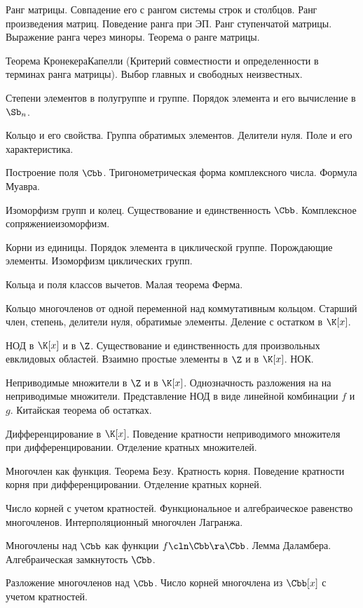 \documentclass[a4paper]{article}
\begin{document}
\begin{nums}{0}
\item Ранг матрицы. Совпадение его с рангом системы строк и столбцов. Ранг произведения матриц. Поведение ранга
при ЭП. Ранг ступенчатой матрицы.
Выражение ранга через миноры. Теорема о ранге матрицы.
\item Теорема Кронекера\ч Капелли (Критерий совместности и определенности в терминах ранга матрицы). Выбор
главных и свободных неизвестных.
\item Степени элементов в полугруппе и группе. Порядок элемента и его вычисление в $\Sb_n$.
\item Кольцо и его свойства. Группа обратимых элементов. Делители нуля. Поле и его характеристика.
\item Построение поля $\Cbb$. Тригонометрическая форма комплексного числа. Формула Муавра.
\item Изоморфизм групп и колец. Существование и единственность $\Cbb$. Комплексное сопряжение\т изоморфизм.
\item Корни из единицы. Порядок элемента в циклической группе. Порождающие элементы. Изоморфизм циклических групп.
\item Кольца и поля классов вычетов. Малая теорема Ферма.
\item Кольцо многочленов от одной переменной над коммутативным кольцом. Старший член, степень, делители нуля,
обратимые элементы. Деление с остатком в $\K[x]$.
\item НОД в $\K[x]$ и в $\Z$. Существование и единственность для произвольных евклидовых областей. Взаимно
простые элементы в $\Z$ и в $\K[x]$. НОК.
\item Неприводимые множители в $\Z$ и в $\K[x]$. Однозначность разложения на на неприводимые множители.
Представление НОД в виде линейной комбинации $f$ и $g$. Китайская теорема об остатках.
\item Дифференцирование в $\K[x]$. Поведение кратности неприводимого множителя при дифференцировании.
Отделение кратных множителей.
\item Многочлен как функция. Теорема Безу. Кратность корня. Поведение кратности корня при дифференцировании.
Отделение кратных корней.
\item Число корней с учетом кратностей. Функциональное и алгебраическое равенство многочленов.
Интерполяционный многочлен Лагранжа.
\item Многочлены над $\Cbb$ как функции $f\cln \Cbb \ra \Cbb$. Лемма Даламбера. Алгебраическая замкнутость $\Cbb$.
\item Разложение многочленов над $\Cbb$. Число корней многочлена из $\Cbb[x]$ с учетом кратностей.

\end{nums}
\end{document}

